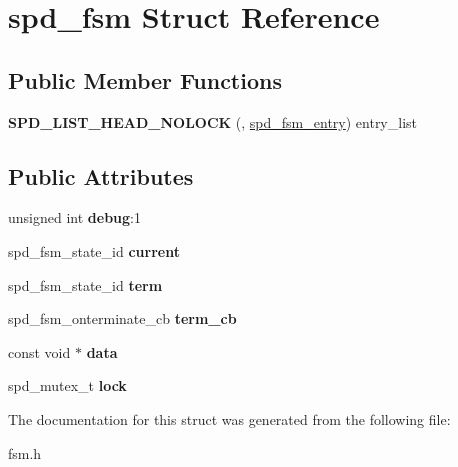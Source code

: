 \hypertarget{structspd__fsm}{
\section{spd\_\-fsm Struct Reference}
\label{structspd__fsm}
}
\subsection*{Public Member Functions}
\begin{DoxyCompactItemize}
\item 
\hypertarget{structspd__fsm_a0f861e75ede3eb1e7d5652e395be2d27}{
{\bfseries SPD\_\-LIST\_\-HEAD\_\-NOLOCK} (, \hyperlink{structspd__fsm__entry}{spd\_\-fsm\_\-entry}) entry\_\-list}
\label{structspd__fsm_a0f861e75ede3eb1e7d5652e395be2d27}

\end{DoxyCompactItemize}
\subsection*{Public Attributes}
\begin{DoxyCompactItemize}
\item 
\hypertarget{structspd__fsm_a899cbe4729d7fcb6543ced937bade160}{
unsigned int {\bfseries debug}:1}
\label{structspd__fsm_a899cbe4729d7fcb6543ced937bade160}

\item 
\hypertarget{structspd__fsm_abc8956505f4fc9101abeb158fbfcf9d4}{
spd\_\-fsm\_\-state\_\-id {\bfseries current}}
\label{structspd__fsm_abc8956505f4fc9101abeb158fbfcf9d4}

\item 
\hypertarget{structspd__fsm_ae3ae537e4a15fe927248202b46dac201}{
spd\_\-fsm\_\-state\_\-id {\bfseries term}}
\label{structspd__fsm_ae3ae537e4a15fe927248202b46dac201}

\item 
\hypertarget{structspd__fsm_ae541f5f05b06f587e6d6165cfdc8a5e3}{
spd\_\-fsm\_\-onterminate\_\-cb {\bfseries term\_\-cb}}
\label{structspd__fsm_ae541f5f05b06f587e6d6165cfdc8a5e3}

\item 
\hypertarget{structspd__fsm_aa81c0318681e53b1cd714c4fc7625af1}{
const void $\ast$ {\bfseries data}}
\label{structspd__fsm_aa81c0318681e53b1cd714c4fc7625af1}

\item 
\hypertarget{structspd__fsm_a6ad6a8a14c05e7cea4173bd9b289cf76}{
spd\_\-mutex\_\-t {\bfseries lock}}
\label{structspd__fsm_a6ad6a8a14c05e7cea4173bd9b289cf76}

\end{DoxyCompactItemize}


The documentation for this struct was generated from the following file:\begin{DoxyCompactItemize}
\item 
fsm.h\end{DoxyCompactItemize}
